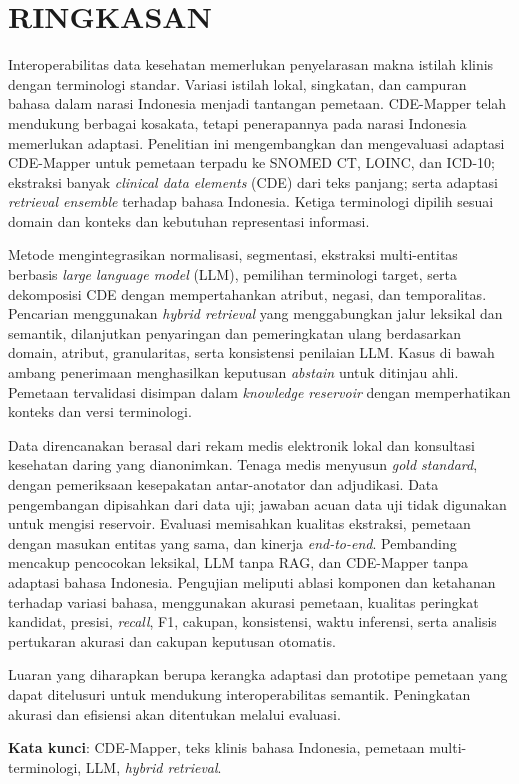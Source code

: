 \chapter*{RINGKASAN}

Interoperabilitas data kesehatan memerlukan penyelarasan makna istilah klinis dengan terminologi standar. Variasi istilah lokal, singkatan, dan campuran bahasa dalam narasi Indonesia menjadi tantangan pemetaan. CDE-Mapper telah mendukung berbagai kosakata, tetapi penerapannya pada narasi Indonesia memerlukan adaptasi. Penelitian ini mengembangkan dan mengevaluasi adaptasi CDE-Mapper untuk pemetaan terpadu ke SNOMED CT, LOINC, dan ICD-10; ekstraksi banyak \textit{clinical data elements} (CDE) dari teks panjang; serta adaptasi \textit{retrieval ensemble} terhadap bahasa Indonesia. Ketiga terminologi dipilih sesuai domain dan konteks dan kebutuhan representasi informasi.

Metode mengintegrasikan normalisasi, segmentasi, ekstraksi multi-entitas berbasis \textit{large language model} (LLM), pemilihan terminologi target, serta dekomposisi CDE dengan mempertahankan atribut, negasi, dan temporalitas. Pencarian menggunakan \textit{hybrid retrieval} yang menggabungkan jalur leksikal dan semantik, dilanjutkan penyaringan dan pemeringkatan ulang berdasarkan domain, atribut, granularitas, serta konsistensi penilaian LLM. Kasus di bawah ambang penerimaan menghasilkan keputusan \textit{abstain} untuk ditinjau ahli. Pemetaan tervalidasi disimpan dalam \textit{knowledge reservoir} dengan memperhatikan konteks dan versi terminologi.

Data direncanakan berasal dari rekam medis elektronik lokal dan konsultasi kesehatan daring yang dianonimkan. Tenaga medis menyusun \textit{gold standard}, dengan pemeriksaan kesepakatan antar-anotator dan adjudikasi. Data pengembangan dipisahkan dari data uji; jawaban acuan data uji tidak digunakan untuk mengisi reservoir. Evaluasi memisahkan kualitas ekstraksi, pemetaan dengan masukan entitas yang sama, dan kinerja \textit{end-to-end}. Pembanding mencakup pencocokan leksikal, LLM tanpa RAG, dan CDE-Mapper tanpa adaptasi bahasa Indonesia. Pengujian meliputi ablasi komponen dan ketahanan terhadap variasi bahasa, menggunakan akurasi pemetaan, kualitas peringkat kandidat, presisi, \textit{recall}, F1, cakupan, konsistensi, waktu inferensi, serta analisis pertukaran akurasi dan cakupan keputusan otomatis.

Luaran yang diharapkan berupa kerangka adaptasi dan prototipe pemetaan yang dapat ditelusuri untuk mendukung interoperabilitas semantik. Peningkatan akurasi dan efisiensi akan ditentukan melalui evaluasi.

\textbf{Kata kunci}: CDE-Mapper, teks klinis bahasa Indonesia, pemetaan multi-terminologi, LLM, \textit{hybrid retrieval}.
